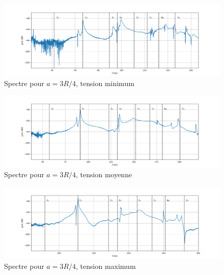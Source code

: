\documentclass[atiam, article]{rapport} %
\begin{document}
\begin{figure}
  \begin{center}
    \includegraphics[width=\textwidth]{percu/timbale-grave-spectre.png}
  \end{center}
  \caption{Spectre pour $a=3R/4$, tension minimum}
  \label{fig:timb-grave-spectre}
\end{figure}


\begin{figure}
  \begin{center}
    \includegraphics[width=\textwidth]{percu/timbale-migrave-spectre.png}
  \end{center}
  \caption{Spectre pour $a=3R/4$, tension moyenne}
  \label{fig:timb-migrave-spectre}
\end{figure}

\begin{figure}
  \begin{center}
    \includegraphics[width=\textwidth]{percu/timbale-aigu-spectre.png}
  \end{center}
  \caption{Spectre pour $a=3R/4$, tension maximum}
  \label{fig:timb-aigu-spectre}
\end{figure}
\end{document}
